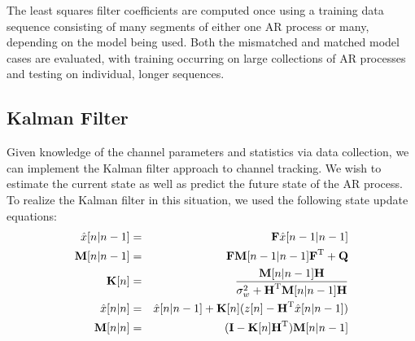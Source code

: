 \documentclass[twocolumn,letterpaper]{IEEEAerospaceCLS}  %
\begin{document}
The least squares filter coefficients are computed once using a training data sequence consisting of many segments of either one AR process or many, depending on the model being used. Both the mismatched and matched model cases are evaluated, with training occurring on large collections of AR processes and testing on individual, longer sequences. 


\subsection{Kalman Filter}

Given knowledge of the channel parameters and statistics via data collection, we can implement the Kalman filter approach to channel tracking. We wish to estimate the current state as well as predict the future state of the AR process. To realize the Kalman filter in this situation, we used the following state update equations: \\
\begin{eqnarray*}
\hat{x}[n|n-1]&=&\textbf{F}\hat{x}[n-1|n-1] \\
\textbf{M}[n|n-1]&=&\textbf{FM}[n-1|n-1]\textbf{F}^{\rm T} + \textbf{Q} \\
\textbf{K}[n]&=&\frac{\textbf{M}[n|n-1]\textbf{H}}{\sigma_{w}^{2} + \textbf{H}^{\rm T}\textbf{M}[n|n-1]\textbf{H}} \\
\hat{x}[n|n]&=&\hat{x}[n|n-1] + \textbf{K}[n](z[n]-\textbf{H}^{\rm T}\hat{x}[n|n-1]) \\
\textbf{M}[n|n]&=&(\textbf{I}-\textbf{K}[n]\textbf{H}^{\rm T})\textbf{M}[n|n-1]
\end{eqnarray*}
\end{document}
